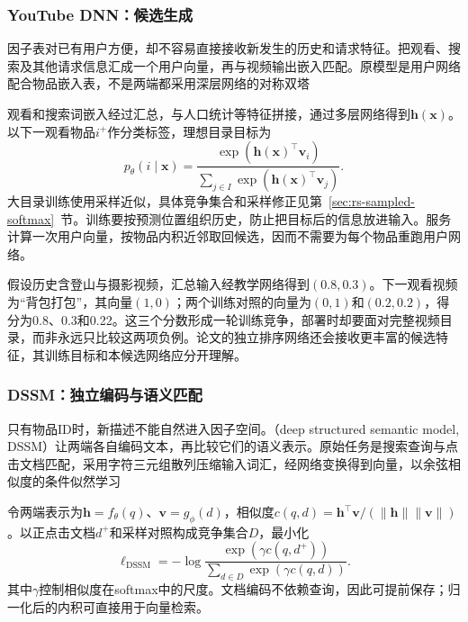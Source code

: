 \subsubsection{YouTube DNN：候选生成}
\label{sec:rs-youtube-candidate}

因子表对已有用户方便，却不容易直接接收新发生的历史和请求特征。把观看、搜索及其他请求信息汇成一个用户向量，再与视频输出嵌入匹配。原模型是用户网络配合物品嵌入表，不是两端都采用深层网络的对称双塔

观看和搜索词嵌入经过汇总，与人口统计等特征拼接，通过多层网络得到$\bm h(\bm x)$。以下一观看物品$i^+$作分类标签，理想目录目标为
\begin{equation}
 p_\theta(i\mid\bm x)=
 \frac{\exp(\bm h(\bm x)^\top\bm v_i)}
 {\sum_{j\in I}\exp(\bm h(\bm x)^\top\bm v_j)}.
 \label{eq:rs-directory-softmax}
\end{equation}
大目录训练使用采样近似，具体竞争集合和采样修正见第~\ref{sec:rs-sampled-softmax}~节。训练要按预测位置组织历史，防止把目标后的信息放进输入。服务计算一次用户向量，按物品内积近邻取回候选，因而不需要为每个物品重跑用户网络。

假设历史含登山与摄影视频，汇总输入经教学网络得到$(0.8,0.3)$。下一观看视频为“背包打包”，其向量$(1,0)$；两个训练对照的向量为$(0,1)$和$(0.2,0.2)$，得分为0.8、0.3和0.22。这三个分数形成一轮训练竞争，部署时却要面对完整视频目录，而非永远只比较这两项负例。论文的独立排序网络还会接收更丰富的候选特征，其训练目标和本候选网络应分开理解。

\subsubsection{DSSM：独立编码与语义匹配}
\label{sec:rs-dssm}

只有物品ID时，新描述不能自然进入因子空间。（deep structured semantic model, DSSM）让两端各自编码文本，再比较它们的语义表示。原始任务是搜索查询与点击文档匹配，采用字符三元组散列压缩输入词汇，经网络变换得到向量，以余弦相似度的条件似然学习

令两端表示为$\bm h=f_\theta(q)$、$\bm v=g_\phi(d)$，相似度$c(q,d)=\bm h^\top\bm v/(\|\bm h\|\|\bm v\|)$。以正点击文档$d^+$和采样对照构成竞争集合$D$，最小化
\begin{equation}
 \ell_{\mathrm{DSSM}}=-\log
       \frac{\exp(\gamma c(q,d^+))}
            {\sum_{d\in D}\exp(\gamma c(q,d))}.
 \label{eq:rs-dssm-loss}
\end{equation}
其中$\gamma$控制相似度在softmax中的尺度。文档编码不依赖查询，因此可提前保存；归一化后的内积可直接用于向量检索。

